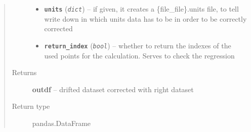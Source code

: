 \documentclass[a4paper,10pt,oneside]{sphinxmanual}
\begin{document}
\begin{fulllineitems}
\begin{quote}
\begin{description}
\begin{itemize}
\item {} 
\textbf{\texttt{units}} (\emph{\texttt{dict}}) -- if given, it creates a \{file\_file\}.units file, to tell write down in which units data has to be in
order to be correctly corrected

\item {} 
\textbf{\texttt{return\_index}} (\emph{\texttt{bool}}) -- whether to return the indexes of the used points for the calculation. Serves to check the regression

\end{itemize}

\item[{Returns}] \leavevmode
\textbf{outdf} -- drifted dataset corrected with right dataset

\item[{Return type}] \leavevmode
pandas.DataFrame

\end{description}\end{quote}

\end{fulllineitems}

\end{document}

